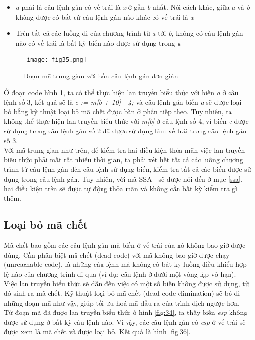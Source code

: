 \begin{itemize}
	\item \textit{a} phải là câu lệnh gán có vế trái là \textit{x} ở gần \textit{b} nhất. Nói cách khác, giữa \textit{a} và \textit{b} không được có bất cứ câu lệnh gán nào khác có vế trái là \textit{x}
	\item Trên tất cả các luồng đi của chương trình từ \textit{a} tới \textit{b}, không có câu lệnh gán nào có vế trái là bất kỳ biến nào được sử dụng trong \textit{a}
\end{itemize}
\begin{figure}[h]
	\centering
	\texttt{[image: fig35.png]}
	\caption{Đoạn mã trung gian với bốn câu lệnh gán đơn giản}
	\label{fig:35}
\end{figure}
Ở đoạn code hình \ref{fig:35}, ta có thể thực hiện lan truyền biểu thức với biến \textit{a} ở câu lệnh số 3, kết quả sẽ là \textit{c := m[b + 10] - 4;} và câu lệnh gán biến \textit{a} sẽ được loại bỏ bằng kỹ thuật loại bỏ mã chết được bàn ở phần tiếp theo. Tuy nhiên, ta không thể thực hiện lan truyền biểu thức với \textit{m[b]} ở câu lệnh số 4, vì biến \textit{c} được sử dụng trong câu lệnh gán số 2 đã được sử dụng làm vế trái trong câu lệnh gán số 3.\\

Với mã trung gian như trên, để kiểm tra hai điều kiện thỏa mãn việc lan truyền biểu thức phải mất rất nhiều thời gian, ta phải xét hết tất cả các luồng chương trình từ câu lệnh gán đến câu lệnh sử dụng biến, kiểm tra tất cả các biến được sử dụng trong câu lệnh gán. Tuy nhiên, với mã SSA - sẽ được nói đến ở mục \ref{ssa}, hai điều kiện trên sẽ được tự động thỏa mãn và không cần bất kỳ kiểm tra gì thêm.
\subsection{Loại bỏ mã chết}

Mã chết bao gồm các câu lệnh gán mà biến ở vế trái của nó không bao giờ được dùng. Cần phân biệt mã chết (dead code) với mã không bao giờ được chạy (unreachable code), là những câu lệnh mà không có bất kỳ luồng điều khiểu hợp lệ nào của chương trình đi qua (ví dụ: câu lệnh ở dưới một vòng lặp vô hạn). Việc lan truyền biểu thức sẽ dẫn đến việc có một số biến không được sử dụng, từ đó sinh ra mã chết. Kỹ thuật loại bỏ mã chết (dead code elimination) \cite{dce} sẽ bỏ đi những đoạn mã như vậy, giúp tối ưu hoá mã đầu ra của trình dịch ngược hơn. \\
Từ đoạn mã đã được lan truyền biểu thức ở hình \ref{fig:34}, ta thấy biến \textit{esp} không được sử dụng ở bất kỳ câu lệnh nào. Vì vậy, các câu lệnh gán có \textit{esp} ở vế trái sẽ được xem là mã chết và được loại bỏ. Kết quả là hình \ref{fig:36}.

